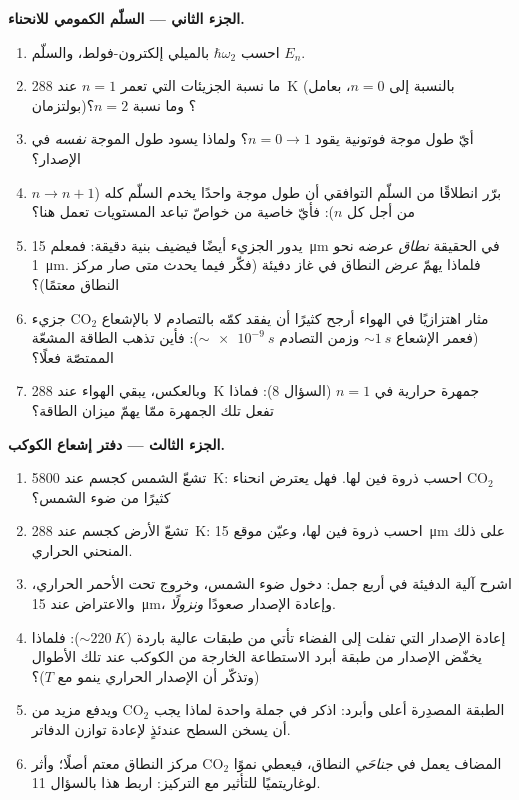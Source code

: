 \begin{problem}
\medskip\noindent\textbf{الجزء الثاني --- السلّم الكمومي للانحناء.}
\begin{enumerate}[resume]
  \item احسب $\hbar\omega_2$ بالميلي إلكترون-فولط، والسلّم $E_n$.
  \item ما نسبة الجزيئات التي تعمر $n = 1$ عند
        \qty{288}{K} (بالنسبة إلى $n = 0$، بعامل بولتزمان)؟ وما نسبة
        $n = 2$؟
  \item أيّ طول موجة فوتونية يقود $n = 0 \to 1$؟ ولماذا يسود
        طول الموجة \emph{نفسه} في الإصدار؟
  \item برّر انطلاقًا من السلّم التوافقي أن طول موجة واحدًا يخدم
        السلّم كله ($n \to n + 1$ من أجل كل $n$): فأيّ
        خاصية من خواصّ تباعد المستويات تعمل هنا؟
  \item يدور الجزيء أيضًا فيضيف بنية دقيقة: فمعلم
        \qty{15}{\micro m} في الحقيقة \emph{نطاق} عرضه نحو
        \qty{1}{\micro m}. فلماذا يهمّ \emph{عرض} النطاق
        في غاز دفيئة (فكّر فيما يحدث متى صار مركز النطاق
        معتمًا)؟
  \item جزيء CO$_2$ مثار اهتزازيًا في الهواء أرجح كثيرًا أن
        يفقد كمّه بالتصادم لا بالإشعاع (فعمر الإشعاع
        $\sim\qty{1}{s}$ وزمن التصادم $\sim\qty{e-9}{s}$):
        فأين تذهب الطاقة المشعّة الممتصّة فعلًا؟
  \item وبالعكس، يبقي الهواء عند \qty{288}{K} جمهرة حرارية
        في $n = 1$ (السؤال 8): فماذا تفعل تلك الجمهرة ممّا
        يهمّ ميزان الطاقة؟
\end{enumerate}

\medskip\noindent\textbf{الجزء الثالث --- دفتر إشعاع الكوكب.}
\begin{enumerate}[resume]
  \item تشعّ الشمس كجسم عند \qty{5800}{K}: احسب ذروة فين
        لها. فهل يعترض انحناء CO$_2$ كثيرًا من ضوء الشمس؟
  \item تشعّ الأرض كجسم عند \qty{288}{K}: احسب ذروة فين
        لها، وعيّن موقع \qty{15}{\micro m} على ذلك المنحني
        الحراري.
  \item اشرح آلية الدفيئة في أربع جمل:
        دخول ضوء الشمس، وخروج تحت الأحمر الحراري، والاعتراض عند
        \qty{15}{\micro m}، وإعادة الإصدار صعودًا \emph{ونزولًا}.
  \item إعادة الإصدار التي تفلت إلى الفضاء تأتي من طبقات عالية
        باردة ($\sim\qty{220}{K}$): فلماذا يخفّض الإصدار من طبقة
        أبرد الاستطاعة الخارجة من الكوكب عند تلك
        الأطوال (وتذكّر أن الإصدار الحراري ينمو مع $T$)؟
  \item ويدفع مزيد من CO$_2$ الطبقة المصدِرة أعلى وأبرد:
        اذكر في جملة واحدة لماذا يجب أن يسخن السطح عندئذٍ
        لإعادة توازن الدفاتر.
  \item مركز النطاق معتم أصلًا؛ وأثر CO$_2$ المضاف
        يعمل في \emph{جناحَي} النطاق، فيعطي نموًا لوغاريتميًا
        للتأثير مع التركيز: اربط هذا بالسؤال 11.
\end{enumerate}


\end{problem}
